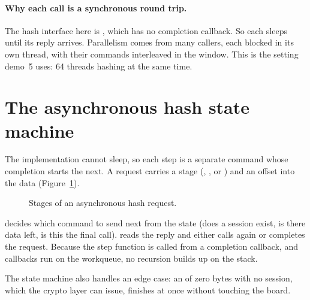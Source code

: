 \paragraph{Why each call is a synchronous round trip.} The hash interface here is , which has no completion callback. So each  sleeps until its reply arrives. Parallelism comes from many callers, each blocked in its own thread, with their commands interleaved in the window. This is the setting demo~5 uses: 64 threads hashing at the same time.

\section{The asynchronous hash state machine}

The  implementation cannot sleep, so each step is a separate command whose completion starts the next. A request carries a stage (, ,  or ) and an offset into the data (Figure~\ref{fig:ahstate}).

\begin{figure}[ht]
\centering
{}
\caption{Stages of an asynchronous hash request.}\label{fig:ahstate}
\end{figure}

 decides which command to send next from the state (does a session exist, is there data left, is this the final call).  reads the reply and either calls  again or completes the request. Because the step function is called from a completion callback, and callbacks run on the workqueue, no recursion builds up on the stack.

The state machine also handles an edge case: an  of zero bytes with no session, which the crypto layer can issue, finishes at once without touching the board.

